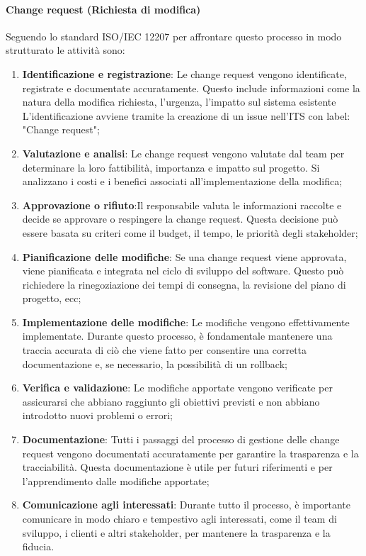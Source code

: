 \documentclass{article}
\begin{document}
\paragraph{Change request (Richiesta di modifica)}
Seguendo lo standard  ISO/IEC 12207 per affrontare questo processo in modo strutturato le attività sono:
\begin{enumerate}
    \item \textbf{Identificazione e registrazione}: Le change request vengono identificate, registrate e documentate accuratamente. Questo include informazioni come la natura della modifica richiesta, l'urgenza, l'impatto sul sistema esistente\\
    L'identificazione avviene tramite la creazione di un issue nell'ITS con label: "Change request";
    \item \textbf{Valutazione e analisi}: Le change request vengono valutate dal team per determinare la loro fattibilità, importanza e impatto sul progetto. Si analizzano i costi e i benefici associati all'implementazione della modifica;
    \item \textbf{Approvazione o rifiuto}:Il responsabile valuta le informazioni raccolte e decide se approvare o respingere la change request. Questa decisione può essere basata su criteri come il budget, il tempo, le priorità degli stakeholder;
    \item \textbf{Pianificazione delle modifiche}: Se una change request viene approvata, viene pianificata e integrata nel ciclo di sviluppo del software. Questo può richiedere la rinegoziazione dei tempi di consegna, la revisione del piano di progetto, ecc;
    \item \textbf{Implementazione delle modifiche}: Le modifiche vengono effettivamente implementate. Durante questo processo, è fondamentale mantenere una traccia accurata di ciò che viene fatto per consentire una corretta documentazione e, se necessario, la possibilità di un rollback;
    \item \textbf{Verifica e validazione}: Le modifiche apportate vengono verificate per assicurarsi che abbiano raggiunto gli obiettivi previsti e non abbiano introdotto nuovi problemi o errori;
    \item \textbf{Documentazione}: Tutti i passaggi del processo di gestione delle change request vengono documentati accuratamente per garantire la trasparenza e la tracciabilità. Questa documentazione è utile per futuri riferimenti e per l'apprendimento dalle modifiche apportate;
    \item \textbf{Comunicazione agli interessati}: Durante tutto il processo, è importante comunicare in modo chiaro e tempestivo agli interessati, come il team di sviluppo, i clienti e altri stakeholder, per mantenere la trasparenza e la fiducia.
\end{enumerate}
\end{document}
